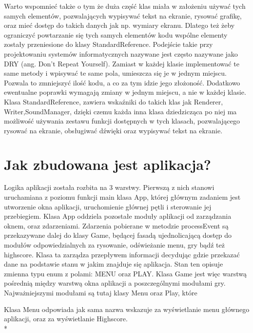 Warto wspomnieć także o tym że duża część klas miała w założeniu używać tych samych elementów, pozwalających wypisywać tekst na ekranie, rysować grafikę, oraz mieć dostęp do takich danych jak np. wymiary ekranu. Dlatego też żeby ograniczyć powtarzanie się tych samych elementów kodu wspólne elementy zostały przeniesione do klasy StandardReference. Podejście takie przy projektowaniu systemów informatycznych nazywane jest często nazywane jako DRY (ang. Don't Repeat Yourself). Zamiast w każdej klasie implementować te same metody i wpisywać te same pola, umieszcza się je w jednym miejscu. Pozwala to zmniejszyć ilość kodu, a co za tym idzie jego złożoność. Dodatkowo ewentualne poprawki wymagają zmiany w jednym miejscu, a nie w każdej klasie. Klasa StandardReference, zawiera wskaźniki do takich klas jak Renderer, Writer,SoundManager, dzięki czemu każda inna klasa dziedzicząca po niej ma możliwość używania zestawu funkcji dostępnych w tych klasach, pozwalającego rysować na ekranie, obsługiwać dźwięki oraz wypisywać tekst na ekranie.

\section{Jak zbudowana jest aplikacja?}

Logika aplikacji została rozbita na 3 warstwy. Pierwszą z nich stanowi uruchamiana z poziomu funkcji main klasa App, której głównym zadaniem jest utworzenie okna aplikacji, uruchomienie głównej pętli i sterowanie jej przebiegiem. Klasa App oddziela pozostałe moduły aplikacji od zarządzania oknem, oraz zdarzeniami. Zdarzenia pobierane w metodzie processEvent są przekazywane dalej do klasy Game, będącej fasadą ujednolicającą dostęp do modułów odpowiedzialnych za rysowanie, odświeżanie menu, gry bądź też highscore. Klasa ta zarządza przepływem informacji decydując gdzie przekazać dane na podstawie stanu w jakim znajduje się aplikacja. Stan ten opisuje zmienna typu enum z polami: MENU oraz PLAY. Klasa Game jest więc warstwą pośrednią między warstwą okna aplikacji a poszczególnymi modułami gry. Najważniejszymi modułami są tutaj klasy Menu oraz Play, które 


Klasa Menu odpowiada jak sama nazwa wskazuje za wyświetlanie menu głównego aplikacji, oraz za wyświetlanie Highscore. \\*


